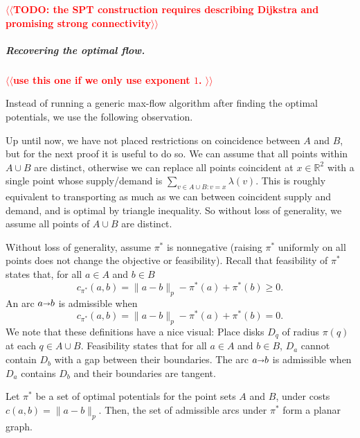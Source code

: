 \documentclass[a4paper,UKenglish]{socg-lipics-v2018}
\makeatletter
\def\note#1{\textcolor{red}{{#1}}}
\def\reals{\mathbb{R}}
\def\norm#1{\mathopen\| #1 \mathclose\|}	%
\def\tsupply{\lambda}
\def\arcto{\mathord\shortrightarrow}
\def\arc#1#2{#1\arcto#2}
\theoremstyle{plain}
\numberwithin{figure}{section}
\renewcommand{\paragraph}{\subparagraph}
\def\n@te#1{\textsf{\boldmath \textbf{$\langle\!\langle$#1$\rangle\!\rangle$}}\leavevmode}
\def\note#1{\textcolor{red}{\n@te{#1}}}
\makeatother
\begin{document}
\note{TODO: the SPT construction requires describing Dijkstra and promising strong connectivity} %

\paragraph{Recovering the optimal flow.}
\note{use this one if we only use exponent $1$. } %


Instead of running a generic max-flow algorithm after finding the optimal
potentials, we use the following observation.

Up until now, we have not placed restrictions on coincidence between $A$ and $B$, but for the next proof it is useful to do so.
We can assume that all points within $A \cup B$ are distinct, otherwise we can
replace all points coincident at $x \in \reals^2$ with a single point whose
supply/demand is $\sum_{v \in A \cup B: v=x}\tsupply(v)$.
This is roughly equivalent to transporting as much as we can between
coincident supply and demand, and is optimal by triangle inequality.
So without loss of generality, we assume all points of $A \cup B$ are distinct.

Without loss of generality, assume $\pi^*$ is nonnegative (raising $\pi^*$
uniformly on all points does not change the objective or feasibility).
Recall that feasibility of $\pi^*$ states that, for all $a \in A$ and $b \in B$
\[
	c_{\pi^*}(a, b) = \norm{a-b}_p - \pi^*(a) + \pi^*(b) \geq 0.
\]
An arc $\arc ab$ is admissible when
\[
	c_{\pi^*}(a, b) = \norm{a-b}_p - \pi^*(a) + \pi^*(b) = 0.
\]
We note that these definitions have a nice visual:
Place disks $D_q$ of radius $\pi(q)$ at each $q \in A \cup B$.
Feasibility states that for all $a \in A$ and $b \in B$, $D_a$ cannot contain
$D_b$ with a gap between their boundaries.
The arc $\arc ab$ is admissible when $D_a$ contains $D_b$ and their boundaries
are tangent.

\begin{lemmarep}
\label{lemma:admiss_planar}
Let $\pi^*$ be a set of optimal potentials for the point sets $A$ and $B$,
under costs $c(a, b) = \norm{a-b}_p$.
Then, the set of admissible arcs under $\pi^*$ form a planar graph.
\end{lemmarep}
\end{document}

